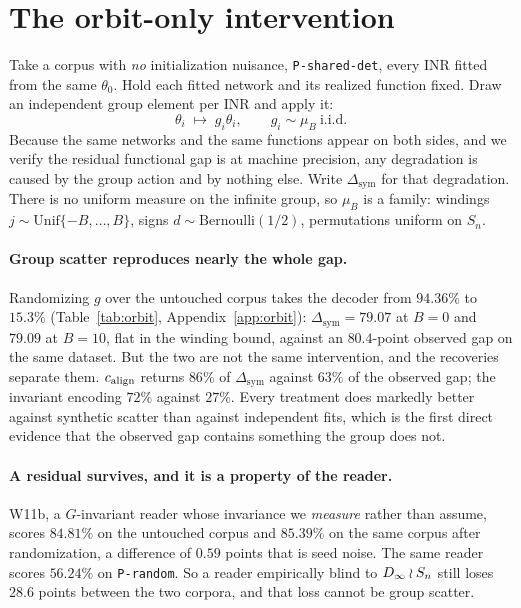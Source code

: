 \section{The orbit-only intervention}\label{sec:orbit}

Take a corpus with \emph{no} initialization nuisance, \texttt{P-shared-det}, every INR fitted from
the same $\theta_0$. Hold each fitted network and its realized function fixed. Draw an independent
group element per INR and apply it:
\begin{equation}
\theta_i \;\longmapsto\; g_i\theta_i, \qquad g_i \sim \mu_B \ \text{i.i.d.}
\label{eq:orbit-intervention}
\end{equation}
Because the same networks and the same functions appear on both sides, and we verify the residual
functional gap is at machine precision, any degradation is caused by the group action and by nothing
else. Write $\Delta_{\mathrm{sym}}$ for that degradation. There is no uniform measure on the
infinite group, so $\mu_B$ is a family: windings $j \sim \mathrm{Unif}\{-B,\dots,B\}$, signs
$d \sim \mathrm{Bernoulli}(1/2)$, permutations uniform on $S_n$.

\paragraph{Group scatter reproduces nearly the whole gap.} Randomizing $g$ over the untouched
corpus takes the decoder from $94.36\%$ to $15.3\%$ (Table~\ref{tab:orbit}, Appendix~\ref{app:orbit}): $\Delta_{\mathrm{sym}} = 79.07$ at $B=0$ and
$79.09$ at $B=10$, flat in the winding bound, against an $80.4$-point observed gap on the same
dataset. But the two are not the same intervention, and the recoveries separate them. $c_{\mathrm{align}}$
returns $86\%$ of $\Delta_{\mathrm{sym}}$ against $63\%$ of the observed gap; the invariant encoding
$72\%$ against $27\%$. Every treatment does markedly better against synthetic scatter than against
independent fits, which is the first direct evidence that the observed gap contains something the
group does not.

\paragraph{A residual survives, and it is a property of the reader.} W11b, a $G$-invariant reader
whose invariance we \emph{measure} rather than assume, scores $84.81\%$ on the untouched corpus and
$85.39\%$ on the same corpus after randomization, a difference of $0.59$ points that is seed noise.
The same reader scores $56.24\%$ on \texttt{P-random}. So a reader empirically blind to
$D_\infty \wr S_n$ still loses $28.6$ points between the two corpora, and that loss cannot be group
scatter.

